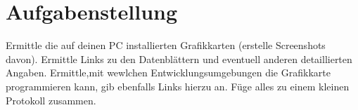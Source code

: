 

\section{Aufgabenstellung}
Ermittle die auf deinen PC installierten Grafikkarten (erstelle Screenshots davon). Ermittle Links zu den Datenblättern und eventuell anderen detaillierten Angaben. Ermittle,mit wewlchen Entwicklungsumgebungen die Grafikkarte programmieren kann, gib ebenfalls Links hierzu an. Füge alles zu einem kleinen Protokoll zusammen.